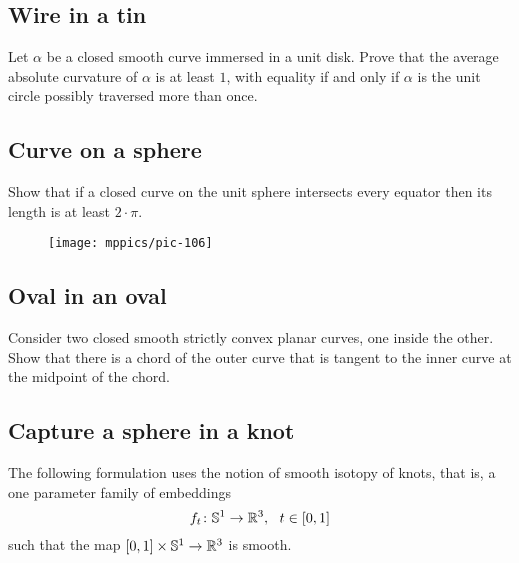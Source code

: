 \subsection*{Wire in a tin}
\label{A spring in a tin} 

\begin{pr}
Let $\alpha$ be a closed smooth curve immersed
in a unit disk. 
Prove that the average absolute curvature of $\alpha$ is at least $1$, with
equality if and only if $\alpha$ is the unit circle possibly traversed more than once.
\end{pr}

\subsection*{Curve on a sphere}
\label{A curve in a sphere}

\begin{pr}
Show that if a closed curve on the unit sphere intersects every equator then its length is at least $2\cdot\pi$.
\end{pr}


{

\begin{wrapfigure}{r}{25 mm}
\vskip2mm
\centering
\texttt{[image: mppics/pic-106]}
\end{wrapfigure}

\subsection*{Oval in an oval}
\label{Oval in oval} 


\begin{pr}
Consider two closed smooth strictly convex planar curves, one inside the other. 
Show that there is a chord of the outer curve that is tangent to the inner curve at the midpoint of the chord.
\end{pr}

}



\subsection*{Capture a sphere in a knot\hard}
\label{Capture a sphere in a knot}

The following formulation uses the notion of smooth isotopy of knots,
that is, a one parameter family of embeddings 
\[f_t\:\mathbb{S}^1\z\to \RR^3,\ \ t\in[0,1]\] 
such that the map $[0,1]\times \mathbb{S}^1\to\mathbb{R}^3$ is smooth.


